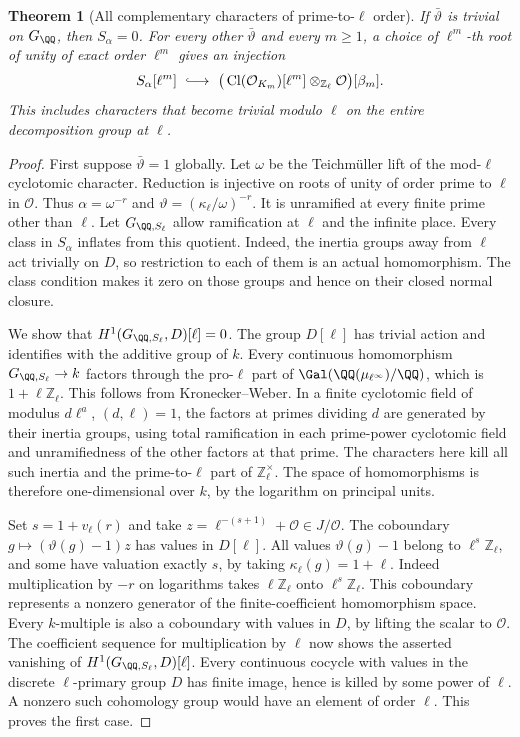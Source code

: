 \documentclass[a4paper,11pt]{article}
\newtheorem{theorem}[proposition]{Theorem}
\theoremstyle{definition}
\theoremstyle{remark}
\newcommand{\ZZ}{\mathbb Z}\newcommand{\ord}{\operatorname{ord}}
\numberwithin{equation}{section}
\newcommand{\Cl}{\operatorname{Cl}}
\newcommand{\OO}{\mathcal O}
\begin{document}
\begin{theorem}[All complementary characters of prime-to-\(\ell\) order]\label{thm:all24}
If \(\bar\vartheta\) is trivial on \(G_\QQ\), then \(S_\alpha=0\). For every other \(\bar\vartheta\) and every \(m\ge1\), a choice of \(\ell^m\)-th root of unity of exact order \(\ell^m\) gives an injection
\begin{equation}
 S_\alpha[\ell^m]\ \lhook\joinrel\longrightarrow\
  \big(\Cl(\OO_{K_m})[\ell^m]\otimes_{\ZZ_\ell}\OO\big)[\beta_m].
 \label{eq:all24}
\end{equation}
This includes characters that become trivial modulo \(\ell\) on the entire decomposition group at \(\ell\).
\end{theorem}
\begin{proof}
First suppose \(\bar\vartheta=1\) globally. Let \(\omega\) be the Teichm\"uller lift of the mod-\(\ell\) cyclotomic character. Reduction is injective on roots of unity of order prime to \(\ell\) in \(\OO\). Thus \(\alpha=\omega^{-r}\) and \(\vartheta=(\kappa_\ell/\omega)^{-r}\). It is unramified at every finite prime other than \(\ell\). Let \(G_{\QQ,S_\ell}\) allow ramification at \(\ell\) and the infinite place. Every class in \(S_\alpha\) inflates from this quotient. Indeed, the inertia groups away from \(\ell\) act trivially on \(D\), so restriction to each of them is an actual homomorphism. The class condition makes it zero on those groups and hence on their closed normal closure.

We show that \(H^1(G_{\QQ,S_\ell},D)[\ell]=0\). The group \(D[\ell]\) has trivial action and identifies with the additive group of \(k\). Every continuous homomorphism \(G_{\QQ,S_\ell}\to k\) factors through the pro-\(\ell\) part of \(\Gal(\QQ(\mu_{\ell^\infty})/\QQ)\), which is \(1+\ell\ZZ_\ell\). This follows from Kronecker--Weber. In a finite cyclotomic field of modulus \(d\ell^a\), \((d,\ell)=1\), the factors at primes dividing \(d\) are generated by their inertia groups, using total ramification in each prime-power cyclotomic field and unramifiedness of the other factors at that prime. The characters here kill all such inertia and the prime-to-\(\ell\) part of \(\ZZ_\ell^\times\). The space of homomorphisms is therefore one-dimensional over \(k\), by the logarithm on principal units.~\cite{V-III-V-kw24}

Set \(s=1+v_\ell(r)\) and take \(z=\ell^{-(s+1)}+\OO\in J/\OO\). The coboundary \(g\mapsto (\vartheta(g)-1)z\) has values in \(D[\ell]\). All values \(\vartheta(g)-1\) belong to \(\ell^s\ZZ_\ell\), and some have valuation exactly \(s\), by taking \(\kappa_\ell(g)=1+\ell\). Indeed multiplication by \(-r\) on logarithms takes \(\ell\ZZ_\ell\) onto \(\ell^s\ZZ_\ell\). This coboundary represents a nonzero generator of the finite-coefficient homomorphism space. Every \(k\)-multiple is also a coboundary with values in \(D\), by lifting the scalar to \(\OO\). The coefficient sequence for multiplication by \(\ell\) now shows the asserted vanishing of \(H^1(G_{\QQ,S_\ell},D)[\ell]\). Every continuous cocycle with values in the discrete \(\ell\)-primary group \(D\) has finite image, hence is killed by some power of \(\ell\). A nonzero such cohomology group would have an element of order \(\ell\). This proves the first case.


\end{proof}
\end{document}
